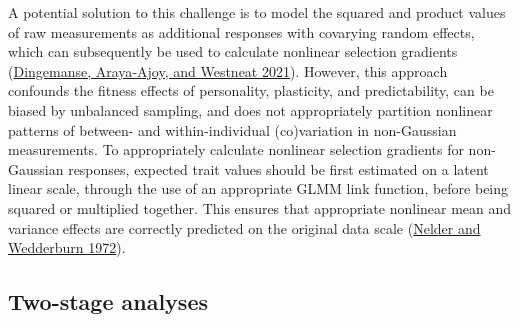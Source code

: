 \documentclass{article}
\begin{document}
A potential solution to this challenge is to model the squared and
product values of raw measurements as additional responses with
covarying random effects, which can subsequently be used to calculate
nonlinear selection gradients
(\protect\hyperlink{ref-Ding2021}{Dingemanse, Araya‐Ajoy, and Westneat
2021}). However, this approach confounds the fitness effects of
personality, plasticity, and predictability, can be biased by unbalanced
sampling, and does not appropriately partition nonlinear patterns of
between- and within-individual (co)variation in non-Gaussian
measurements. To appropriately calculate nonlinear selection gradients
for non-Gaussian responses, expected trait values should be first
estimated on a latent linear scale, through the use of an appropriate
GLMM link function, before being squared or multiplied together. This
ensures that appropriate nonlinear mean and variance effects are
correctly predicted on the original data scale
(\protect\hyperlink{ref-Nelder1972}{Nelder and Wedderburn 1972}).

\hypertarget{two-stage-analyses}{%
\subsection{Two-stage analyses}\label{two-stage-analyses}}
\end{document}
